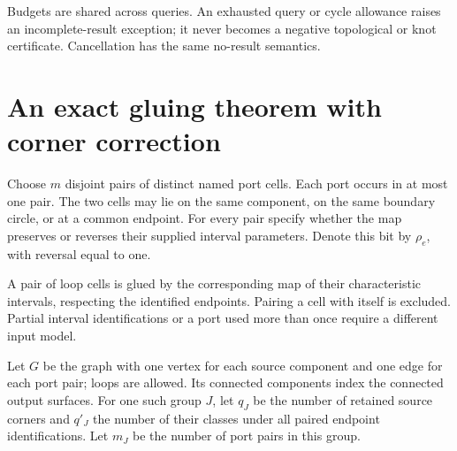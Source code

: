 \documentclass[11pt]{article}
\theoremstyle{definition}
\theoremstyle{remark}\newtheorem{remark}[theorem]{Remark}
\begin{document}
Budgets are shared across queries. An exhausted query or cycle allowance raises an incomplete-result exception; it never becomes a negative topological or knot certificate. Cancellation has the same no-result semantics.

\section{An exact gluing theorem with corner correction}
\label{sec:glue}

Choose $m$ disjoint pairs of distinct named port cells. Each port occurs in at most one pair. The two cells may lie on the same component, on the same boundary circle, or at a common endpoint. For every pair specify whether the map preserves or reverses their supplied interval parameters. Denote this bit by $\rho_e$, with reversal equal to one.

A pair of loop cells is glued by the corresponding map of their characteristic intervals, respecting the identified endpoints. Pairing a cell with itself is excluded. Partial interval identifications or a port used more than once require a different input model.

Let $G$ be the graph with one vertex for each source component and one edge for each port pair; loops are allowed. Its connected components index the connected output surfaces. For one such group $J$, let $q_J$ be the number of retained source corners and $q'_J$ the number of their classes under all paired endpoint identifications. Let $m_J$ be the number of port pairs in this group.
\end{document}
